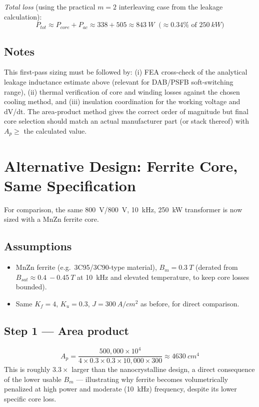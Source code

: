 \documentclass[11pt,a4paper]{article}
\begin{document}
\textit{Total loss} (using the practical $m=2$ interleaving case from the
leakage calculation):
\begin{equation}
    P_{tot} \approx P_{core}+P_{ac} \approx 338+505 \approx \SI{843}{W}
    \;\;\big(\approx 0.34\% \text{ of } \SI{250}{kW}\big)
\end{equation}

\subsection*{Notes}
This first-pass sizing must be followed by: (i) FEA cross-check of the analytical
leakage inductance estimate above (relevant for DAB/PSFB soft-switching range),
(ii) thermal verification of core and winding losses against the chosen cooling
method, and (iii) insulation coordination for the working voltage and dV/dt. The
area-product method gives the correct order of magnitude but final core selection
should match an actual manufacturer part (or stack thereof) with $A_p \ge$ the
calculated value.

\section{Alternative Design: Ferrite Core, Same Specification}
For comparison, the same \SI{800}{V}/\SI{800}{V}, \SI{10}{kHz}, \SI{250}{kW}
transformer is now sized with a MnZn ferrite core.

\subsection*{Assumptions}
\begin{itemize}
    \item MnZn ferrite (e.g.\ 3C95/3C90-type material), $B_m=\SI{0.3}{T}$
    (derated from $B_{sat}\approx\SI{0.4}{-}\SI{0.45}{T}$ at \SI{10}{kHz} and
    elevated temperature, to keep core losses bounded).
    \item Same $K_f=4$, $K_u=0.3$, $J=\SI{300}{A/cm^2}$ as before, for direct
    comparison.
\end{itemize}

\subsection*{Step 1 — Area product}
\begin{equation}
    A_p = \frac{500{,}000\times10^4}{4\times0.3\times0.3\times10{,}000\times300}
    \approx \SI{4630}{cm^4}
\end{equation}
This is roughly $3.3\times$ larger than the nanocrystalline design, a direct
consequence of the lower usable $B_m$ — illustrating why ferrite becomes
volumetrically penalized at high power and moderate (\SI{10}{kHz}) frequency,
despite its lower specific core loss.
\end{document}
